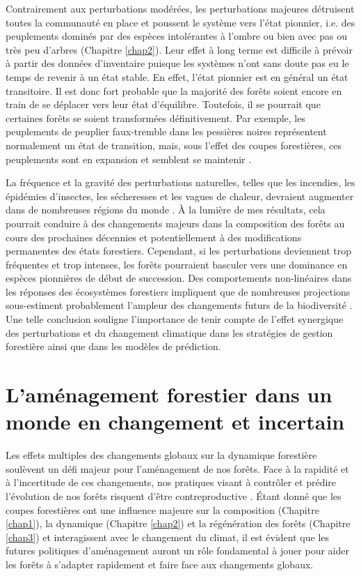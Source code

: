 Contrairement aux perturbations modérées, les perturbations majeures
détruisent toutes la communauté en place et poussent le système vers
l'état pionnier, i.e. des peuplements dominés par des espèces
intolérantes à l'ombre ou bien avec pas ou très peu d'arbres (Chapitre
\ref{chap2}). Leur effet à long terme est difficile à prévoir à partir
des données d'inventaire puisque les systèmes n'ont sans doute pas eu le
temps de revenir à un état stable. En effet, l'état pionnier est en
général un état transitoire. Il est donc fort probable que la majorité
des forêts soient encore en train de se déplacer vers leur état
d'équilibre. Toutefois, il se pourrait que certaines forêts se soient
transformées définitivement. Par exemple, les peuplements de peuplier
faux-tremble dans les pessières noires représentent normalement un état
de transition, mais, sous l'effet des coupes forestières, ces
peuplements sont en expansion et semblent se maintenir
\citep{grondin_les_2003}.

La fréquence et la gravité des perturbations naturelles, telles que les
incendies, les épidémies d'insectes, les sécheresses et les vagues de
chaleur, devraient augmenter dans de nombreuses régions du monde
\citep{seidl_forest_2017, bergeron_past_2006}. À la lumière de mes
résultats, cela pourrait conduire à des changements majeurs dans la
composition des forêts au cours des prochaines décennies et
potentiellement à des modifications permanentes des états forestiers.
Cependant, si les perturbations deviennent trop fréquentes et trop
intenses, les forêts pourraient basculer vers une dominance en espèces
pionnières de début de succession. Des comportements non-linéaires dans
les réponses des écosystèmes forestiers impliquent que de nombreuses
projections sous-estiment probablement l'ampleur des changements futurs
de la biodiversité \citep{scheffer_catastrophic_2001}. Une telle
conclusion souligne l'importance de tenir compte de l'effet synergique
des perturbations et du changement climatique dans les stratégies de
gestion forestière ainsi que dans les modèles de prédiction.

\hypertarget{lamuxe9nagement-forestier-dans-un-monde-en-changement-et-incertain}{%
\section{L'aménagement forestier dans un monde en changement et
incertain}\label{lamuxe9nagement-forestier-dans-un-monde-en-changement-et-incertain}}

Les effets multiples des changements globaux sur la dynamique forestière
soulèvent un défi majeur pour l'aménagement de nos forêts. Face à la
rapidité et à l'incertitude de ces changements, nos pratiques visant à
contrôler et prédire l'évolution de nos forêts risquent d'être
contreproductive \citep{puettmann_critique_2009}. Étant donné que les
coupes forestières ont une influence majeure sur la composition
(Chapitre \ref{chap1}), la dynamique (Chapitre \ref{chap2}) et la
régénération des forêts (Chapitre \ref{chap3}) et interagissent avec le
changement du climat, il est évident que les futures politiques
d'aménagement auront un rôle fondamental à jouer pour aider les forêts à
s'adapter rapidement et faire face aux changements globaux.

